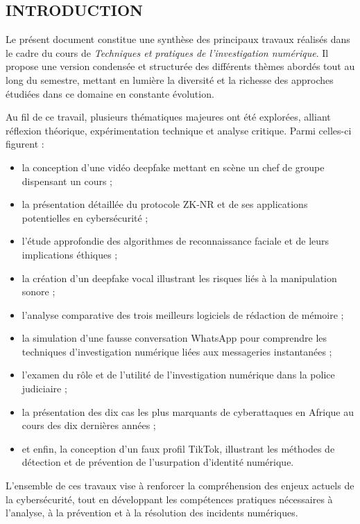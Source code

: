 \documentclass[12pt]{article}
\begin{document}
\begin{center}

    \section{INTRODUCTION}
   Le présent document constitue une synthèse des principaux travaux réalisés dans le cadre du cours de \textit{Techniques et pratiques de l’investigation numérique}. Il propose une version condensée et structurée des différents thèmes abordés tout au long du semestre, mettant en lumière la diversité et la richesse des approches étudiées dans ce domaine en constante évolution.

Au fil de ce travail, plusieurs thématiques majeures ont été explorées, alliant réflexion théorique, expérimentation technique et analyse critique. Parmi celles-ci figurent :

\begin{itemize}[leftmargin=*, label=\textbullet]
    \item la conception d’une vidéo deepfake mettant en scène un chef de groupe dispensant un cours ;
    \item la présentation détaillée du protocole ZK-NR et de ses applications potentielles en cybersécurité ;
    \item l’étude approfondie des algorithmes de reconnaissance faciale et de leurs implications éthiques ;
    \item la création d’un deepfake vocal illustrant les risques liés à la manipulation sonore ;
    \item l’analyse comparative des trois meilleurs logiciels de rédaction de mémoire ;
    \item la simulation d’une fausse conversation WhatsApp pour comprendre les techniques d’investigation numérique liées aux messageries instantanées ;
    \item l’examen du rôle et de l’utilité de l’investigation numérique dans la police judiciaire ;
    \item la présentation des dix cas les plus marquants de cyberattaques en Afrique au cours des dix dernières années ;
    \item et enfin, la conception d’un faux profil TikTok, illustrant les méthodes de détection et de prévention de l’usurpation d’identité numérique.
\end{itemize}

L’ensemble de ces travaux vise à renforcer la compréhension des enjeux actuels de la cybersécurité, tout en développant les compétences pratiques nécessaires à l’analyse, à la prévention et à la résolution des incidents numériques.


\end{center}
\end{document}
